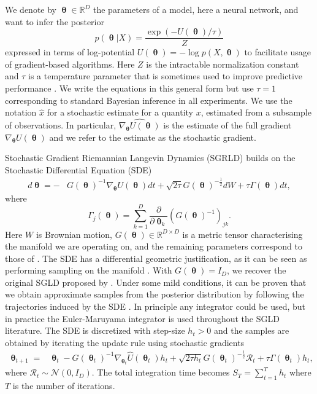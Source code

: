 \documentclass[10pt]{article} %
\DeclareMathOperator{\btheta}{\boldsymbol{\theta}}
\theoremstyle{plain}
\theoremstyle{definition}
\theoremstyle{remark}
\begin{document}
We denote by $\btheta \in \mathbb{R}^D$ the parameters of a model, here a neural network, and want to infer the posterior  
\begin{equation}
p(\btheta|X) = \frac{\exp(-U(\btheta)/\tau)}{Z}
\label{eq:potential}
\end{equation}
expressed in terms of log-potential $U(\btheta) = -\log p(X,\btheta)$ to facilitate usage of gradient-based algorithms.  Here $Z$ is the intractable normalization constant and $\tau$ is a temperature parameter that is sometimes used to improve predictive performance \citep{Wenzel2020}. We write the equations in this general form but use $\tau=1$ corresponding to standard Bayesian inference in all experiments.
We use the notation $\hat{x}$ for a stochastic estimate for a quantity $x$, estimated from a subsample of observations. In particular, $\hat{\nabla_{\btheta} U(\btheta)}$ is the estimate of the full gradient $\nabla_{\btheta} U(\btheta)$ and we refer to the estimate as the stochastic gradient.

Stochastic Gradient Riemannian Langevin Dynamics (SGRLD) \citep{Girolami2011,Patterson2013,Ma2015} builds on the Stochastic Differential Equation (SDE) \citep{Sarkka2019}
\begin{align}
\label{sgrld-sde}
d\btheta = -&G(\btheta)^{-1}\nabla_{\btheta}U(\btheta)dt +\sqrt{2\tau}G(\btheta)^{-\frac{1}{2}}dW+\tau \Gamma(\btheta)dt,    
\end{align}
where
\begin{equation*}
\Gamma_{j}(\btheta) = \sum_{k=1}^{D} \frac{\partial}{\partial\btheta_{k}}(G(\btheta)^{-1})_{jk}.
\end{equation*}
Here $W$ is Brownian motion, $G(\btheta) \in \mathbb{R}^{D \times D}$ is a metric tensor characterising the manifold we are operating on, and the remaining parameters correspond to those of . 
The SDE has a differential geometric justification, as it can be seen as performing sampling on the manifold \citep{Girolami2011}. 
With $G(\btheta)=I_{D}$, we recover the original SGLD proposed by \citet{Welling2011}.
Under some mild conditions, it can be proven that we obtain approximate samples from the posterior distribution by following the trajectories induced by the SDE \citep{Ma2015}. 
In principle any integrator could be used, but in practice the Euler-Maruyama integrator is used throughout the SGLD literature. The SDE is discretized with step-size $h_{t}>0$ and 
the samples are obtained by iterating the update rule using stochastic gradients
\begin{align}
\label{eq:integrator}
\btheta_{t+1} = &\btheta_{t} -G(\btheta_t)^{-1}\nabla_{\btheta_t}\hat{U}(\btheta_t)h_t + \sqrt{2\tau h_t}G(\btheta_t)^{-\frac{1}{2}}\mathcal{R}_t +\tau \Gamma(\btheta_t)h_{t},
\end{align}
where $\mathcal{R}_t\sim \mathcal{N}(0,I_D)$. The total integration time becomes $S_{T}=\sum^{T}_{t=1}h_t$ where $T$ is the number of iterations.
\end{document}
